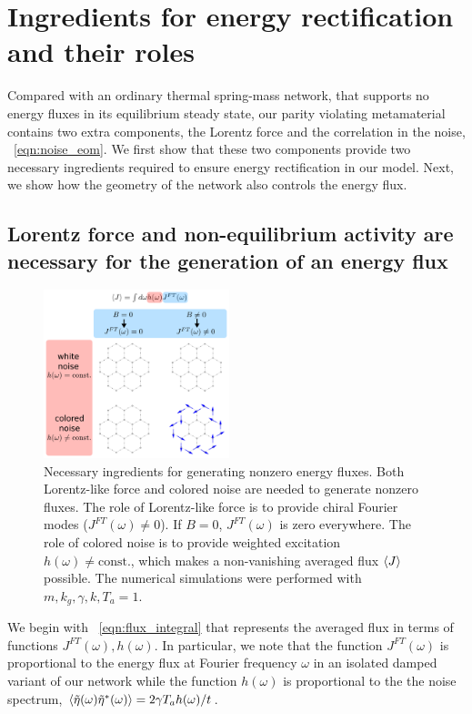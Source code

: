 \documentclass[
 preprint,
 preprintnumbers,
 amsmath,amssymb,
 aps,
 pre,
 longbibliography,
 superscriptaddress,
 10pt, twocolumn
]{revtex4-1}
\begin{document}
\section{Ingredients for energy rectification and their roles} \label{sec:fourier}

Compared with an ordinary thermal spring-mass network, that supports no energy fluxes in its equilibrium steady state, our parity violating metamaterial contains two extra components, the Lorentz force and the correlation in the noise, \eqnname~\ref{eqn:noise_eom}.
We first show that these two components provide two necessary ingredients required to ensure energy rectification in our model. Next, we show how the geometry of the network also controls the energy flux. 



\subsection{Lorentz force and non-equilibrium activity are necessary for the generation of an energy flux} 

\begin{figure}[ht]
	\centering
	\includegraphics[width=0.48\textwidth]{ingredients.pdf}
    \caption{
    Necessary ingredients for generating nonzero energy fluxes.
    Both Lorentz-like force and colored noise are needed to generate nonzero fluxes.
    The role of Lorentz-like force is to provide chiral Fourier modes ($J^{FT}(\omega)\neq 0$). If $B=0$, $J^{FT}(\omega)$ is zero everywhere. 
    The role of colored noise is to provide weighted excitation $h(\omega)\neq \text{const.}$, which makes a non-vanishing averaged flux $\expval{J}$ possible.
    The numerical simulations were performed with $m,k_g,\gamma,k, T_a=1$. 
    }
    \label{fig:ingredients}
\end{figure}
We begin with \eqnname~\eqref{eqn:flux_integral} that represents the averaged flux in terms of functions $J^{FT}(\omega), h(\omega)$. In particular, we note that the function $J^{FT}(\omega)$ is proportional to the energy flux at Fourier frequency $\omega$ in an isolated damped variant of our network while the function $h(\omega)$ is proportional to the the noise spectrum, $\expval{\tilde{\eta}(\omega)\tilde{\eta}^*(\omega)} = 2\gamma T_a h(\omega) / t$.
\end{document}
